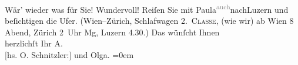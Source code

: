 \begin{ledgroupsized}[t]{13cm}
           \pstart
           {\pb}Wär’ wieder was für Sie! Wundervoll! Reiſen Sie mit
                  Paula\substVorne{}\textsuperscript{\textcolor{gray}{auch}}\substDazwischen{}nach\substHinten{}{ }Luzern und beſichtigen die Ufer. (Wien–Zürich, Schlafwagen 2. \textsc{Classe}, (wie wir) ab Wien 8
               Abend, Zürich 2 Uhr \introOben{}Mg\introOben{}, Luzern 4.30.)\pend
           \pstart
           Das wünſcht Ihnen{\\[\baselineskip]}herzlichſt Ihr \spacefill\mbox{A.}{\\[\baselineskip]}{[}hs. O. Schnitzler:{]} und \spacefill\mbox{Olga.}\pend
           \leftskip=0em{}          \endnumbering{}\end{ledgroupsized}  \newcommand{\dateiname}{L01933}\newcommand{\titel}{Arthur und Olga Schnitzler an Richard Beer-Hofmann, 22. 5. 1910}\newcommand{\editorInnen}{Martin Anton Müller und Gerd-Hermann Susen}
            \footnotesize
\begin{ledgroupsized}[t]{11.5cm}
\end{ledgroupsized}
         
      